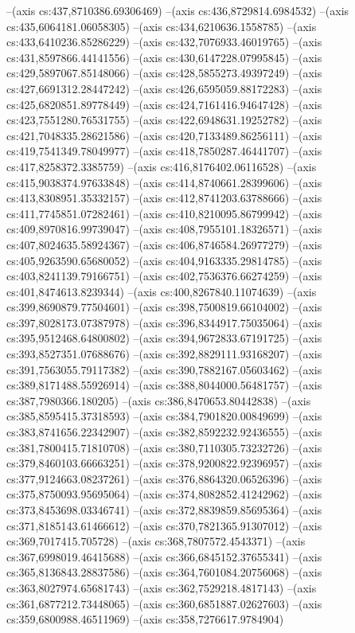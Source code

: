 --(axis cs:437,8710386.69306469)
--(axis cs:436,8729814.6984532)
--(axis cs:435,6064181.06058305)
--(axis cs:434,6210636.1558785)
--(axis cs:433,6410236.85286229)
--(axis cs:432,7076933.46019765)
--(axis cs:431,8597866.44141556)
--(axis cs:430,6147228.07995845)
--(axis cs:429,5897067.85148066)
--(axis cs:428,5855273.49397249)
--(axis cs:427,6691312.28447242)
--(axis cs:426,6595059.88172283)
--(axis cs:425,6820851.89778449)
--(axis cs:424,7161416.94647428)
--(axis cs:423,7551280.76531755)
--(axis cs:422,6948631.19252782)
--(axis cs:421,7048335.28621586)
--(axis cs:420,7133489.86256111)
--(axis cs:419,7541349.78049977)
--(axis cs:418,7850287.46441707)
--(axis cs:417,8258372.3385759)
--(axis cs:416,8176402.06116528)
--(axis cs:415,9038374.97633848)
--(axis cs:414,8740661.28399606)
--(axis cs:413,8308951.35332157)
--(axis cs:412,8741203.63788666)
--(axis cs:411,7745851.07282461)
--(axis cs:410,8210095.86799942)
--(axis cs:409,8970816.99739047)
--(axis cs:408,7955101.18326571)
--(axis cs:407,8024635.58924367)
--(axis cs:406,8746584.26977279)
--(axis cs:405,9263590.65680052)
--(axis cs:404,9163335.29814785)
--(axis cs:403,8241139.79166751)
--(axis cs:402,7536376.66274259)
--(axis cs:401,8474613.8239344)
--(axis cs:400,8267840.11074639)
--(axis cs:399,8690879.77504601)
--(axis cs:398,7500819.66104002)
--(axis cs:397,8028173.07387978)
--(axis cs:396,8344917.75035064)
--(axis cs:395,9512468.64800802)
--(axis cs:394,9672833.67191725)
--(axis cs:393,8527351.07688676)
--(axis cs:392,8829111.93168207)
--(axis cs:391,7563055.79117382)
--(axis cs:390,7882167.05603462)
--(axis cs:389,8171488.55926914)
--(axis cs:388,8044000.56481757)
--(axis cs:387,7980366.180205)
--(axis cs:386,8470653.80442838)
--(axis cs:385,8595415.37318593)
--(axis cs:384,7901820.00849699)
--(axis cs:383,8741656.22342907)
--(axis cs:382,8592232.92436555)
--(axis cs:381,7800415.71810708)
--(axis cs:380,7110305.73232726)
--(axis cs:379,8460103.66663251)
--(axis cs:378,9200822.92396957)
--(axis cs:377,9124663.08237261)
--(axis cs:376,8864320.06526396)
--(axis cs:375,8750093.95695064)
--(axis cs:374,8082852.41242962)
--(axis cs:373,8453698.03346741)
--(axis cs:372,8839859.85695364)
--(axis cs:371,8185143.61466612)
--(axis cs:370,7821365.91307012)
--(axis cs:369,7017415.705728)
--(axis cs:368,7807572.4543371)
--(axis cs:367,6998019.46415688)
--(axis cs:366,6845152.37655341)
--(axis cs:365,8136843.28837586)
--(axis cs:364,7601084.20756068)
--(axis cs:363,8027974.65681743)
--(axis cs:362,7529218.4817143)
--(axis cs:361,6877212.73448065)
--(axis cs:360,6851887.02627603)
--(axis cs:359,6800988.46511969)
--(axis cs:358,7276617.9784904)

